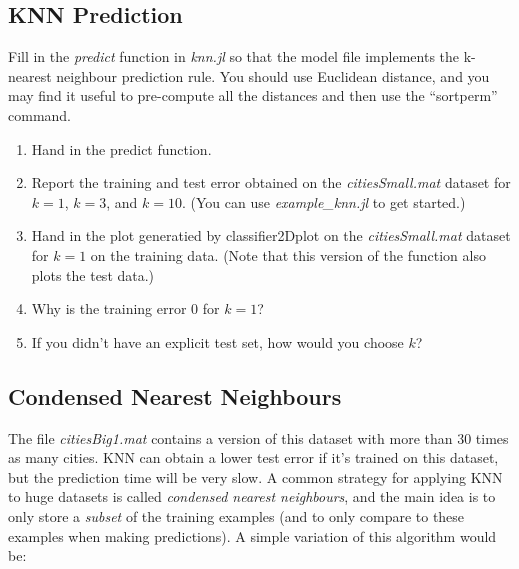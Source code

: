 \documentclass{article}
\def\blu#1{{\color{blu}#1}}
\def\enum#1{\begin{enumerate}#1\end{enumerate}}
\begin{document}
\subsection{KNN Prediction}

Fill in the \emph{predict} function in \emph{knn.jl} so that the model file implements the k-nearest neighbour prediction rule. You should use Euclidean distance, and  you may find it useful to pre-compute all the distances and then use the ``sortperm'' command.
\blu{
\enum{
\item Hand in the predict function. 
\item Report  the training and test error obtained on the \emph{citiesSmall.mat} dataset for $k=1$, $k=3$, and $k=10$. (You can use \emph{example\_knn.jl} to get started.)
\item Hand in the plot generatied by {classifier2Dplot} on the \emph{citiesSmall.mat} dataset for $k=1$ on the training data. (Note that this version of the function also plots the test data.)
\item Why is the training error $0$ for $k=1$?
\item If you didn't have an explicit test set, how would you choose $k$?
}}


\subsection{Condensed Nearest Neighbours}

The file \emph{citiesBig1.mat} contains a version of this dataset with more than 30 times as many cities. KNN can obtain a lower test error if it's trained on this dataset, but the prediction time will be very slow. A common strategy for applying KNN to huge datasets is called \emph{condensed nearest neighbours}, and the main idea is to only store a \emph{subset} of the training examples (and to only compare to these examples when making predictions). A simple variation of this algorithm would be:
\end{document}
